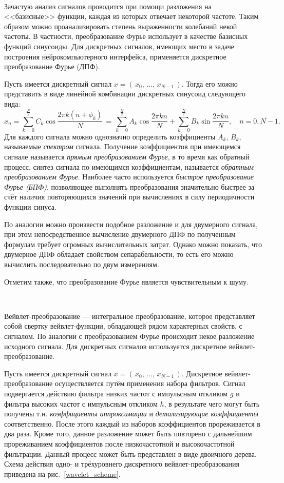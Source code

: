 \documentclass[12pt,a4paper,oneside,fleqn,leqno]{article}
\newcounter{pe} %
\newcommand*{\Nep}{\addtocounter{pe}{1}{\arabic{pe}$^{\circ}$.\;}}
\newcommand*{\NepS}{\mbox{} \\ \Nep}
\begin{document}
	\NepS {\bf Преобразование Фурье}
	\par Зачастую анализ сигналов проводится при помощи разложения на <<базисные>> функции, каждая из которых отвечает некоторой частоте. Таким образом можно проанализировать степень выраженности колебаний некой частоты. В частности, преобразование Фурье использует в качестве базисных функций синусоиды. Для дискретных сигналов, имеющих место в задаче построения нейрокомпьютерного интерфейса, применяется дискретное преобразование Фурье (ДПФ).
	\par Пусть имеется дискретный сигнал $x = (\, x_0, \, \ldots, \, x_{N-1}\, )$. Тогда его можно представить в виде линейной комбинации дискретных синусоид следующего вида:
$$x_n = \sum_{k=0}^{\frac{N}{2}} C_k \cos{\frac{2 \pi k (n + \phi_k)}{N}}\, = \, \sum_{k=0}^{\frac{N}{2}} A_k \cos{\frac{2 \pi k n}{N}} + \sum_{k=0}^{\frac{N}{2}} B_k \sin{\frac{2 \pi k n}{N}}, \quad n = \overline{0, N-1}.$$
	Для каждого сигнала можно однозначно определить коэффициенты $A_k,\, B_k,$ называемые {\it спектром} сигнала. Получение коэффициентов при имеющемся сигнале называется {\it прямым преобразованием Фурье}, в то время как обратный процесс, синтез сигнала по имеющимся коэффициентам, называется {\it обратным преобразованием Фурье}. Наиболее часто используется {\it быстрое преобразование Фурье (БПФ)}, позволяющее выполнять преобразования значительно быстрее за счёт  наличия повторяющихся значений при вычислениях в силу периодичности функции синуса. 
	\par По аналогии можно произвести подобное разложение и для двумерного сигнала, при этом непосредственное вычисление двумерного ДПФ по полученным формулам требует огромных вычислительных затрат. Однако можно показать, что двумерное ДПФ обладает свойством сепарабельности, то есть его можно вычислить последовательно по двум измерениям. 
	\par Отметим также, что преобразование Фурье является чувствительным к шуму.

	\NepS {\bf Вейвлет-преобразование}
	\par Вейвлет-преобразование — интегральное преобразование, которое представляет собой свертку вейвлет-функции, обладающей рядом характерных свойств, с сигналом. По аналогии с преобразованием Фурье происходит некое разложение исходного сигнала. Для дискретных сигналов используется дискретное вейвлет-преобразование.
	\par Пусть имеется дискретный сигнал $x = (\, x_0, \, \ldots, \, x_{N-1}\, )$. Дискретное вейвлет-преобразование осуществляется путём применения набора фильтров. Сигнал подвергается действию фильтра низких частот с импульсным откликом $g$ и фильтра высоких частот с импульсным откликом $h$, в результате чего могут быть получены т.н. {\it коэффициенты аппроксимации} и {\it детализирующие коэффициенты} соответственно. После этого каждый из наборов коэффициентов прореживается в два раза. Кроме того, данное разложение может быть повторено с дальнейшим прореживанием коэффициентов после низкочастотной и высокочастотной фильтрации. Данный процесс может быть представлен в виде двоичного дерева. Схема действия одно- и трёхуровнего дискретного вейвлет-преобразования приведена на рис.~\ref{wavelet_scheme}.
\end{document}
